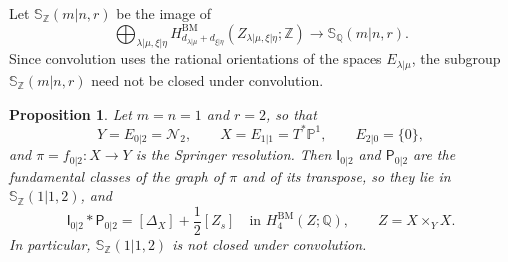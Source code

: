 \documentclass[11pt,a4paper]{amsart}
\newtheorem{proposition}[theorem]{Proposition}
\theoremstyle{definition}
\theoremstyle{remark}
\newcommand{\Q}{\mathbb Q}
\newcommand{\N}{\mathcal N}
\newcommand{\bS}{\mathbb S}
\newcommand{\BM}{\mathrm{BM}}
\newcommand{\lm}{\lambda|\mu}
\newcommand{\xh}{\xi|\eta}
\numberwithin{equation}{section}
\begin{document}
Let $\bS_{\mathbb Z}(m|n,r)$ be the image of
$$
\bigoplus_{\lm,\xh}H^{\BM}_{d_{\lm}+d_{\xh}}(Z_{\lm,\xh};\mathbb Z)
\longrightarrow\bS_\Q(m|n,r).
$$
Since convolution uses the rational orientations of the spaces
$E_{\lm}$, the subgroup $\bS_{\mathbb Z}(m|n,r)$ need not be closed under
convolution.

\begin{samepage}
\begin{proposition}\label{prop:integral-nonclosure}
Let $m=n=1$ and $r=2$, so that
$$
 Y=E_{0|2}=\N_2,\qquad
 X=E_{1|1}=T^*\mathbb P^1,\qquad
 E_{2|0}=\{0\},
$$
and $\pi=f_{0|2}:X\to Y$ is the Springer resolution. Then
$\mathsf I_{0|2}$ and $\mathsf P_{0|2}$ are the fundamental classes of
the graph of $\pi$ and of its transpose, so they lie in
$\bS_{\mathbb Z}(1|1,2)$, and
\begin{equation}\label{eq:integral-nonclosure-ip}
 \mathsf I_{0|2}*\mathsf P_{0|2}=[\Delta_X]+\frac12[Z_s]
 \quad\text{in }H^{\BM}_4(Z;\Q),\qquad Z=X\times_Y X.
\end{equation}
In particular, $\bS_{\mathbb Z}(1|1,2)$ is not closed under convolution.
\end{proposition}
\end{samepage}
\end{document}
